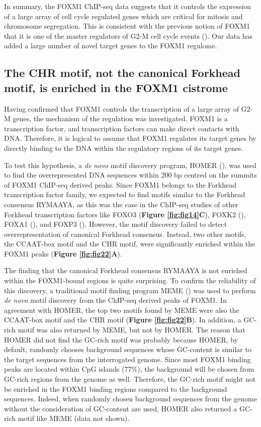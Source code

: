 In summary, the FOXM1 ChIP-seq data suggests that it controls the expression of a large array of cell cycle regulated genes which are critical for mitosis and chromosome segregation. This is consistent with the previous notion of FOXM1 that it is one of the master regulators of G2-M cell cycle events (\cite{laoukili2005foxm1}). Our data has added a large number of novel target genes to the FOXM1 regulome.

\subsection{The CHR motif, not the canonical Forkhead motif, is enriched in the FOXM1 cistrome}

Having confirmed that FOXM1 controls the transcription of a large array of G2-M genes, the mechanism of the regulation was investigated. FOXM1 is a transcription factor, and transcription factors can make direct contacts with DNA. Therefore, it is logical to assume that FOXM1 regulates its target genes by directly binding to the DNA within the regulatory regions of its target genes.

To test this hypothesis, a \textit{de novo} motif discovery program, HOMER (\cite{heinz2010simple}), was used to find the overrepresented DNA sequences within 200 bp centred on the summits of FOXM1 ChIP-seq derived peaks. Since FOXM1 belongs to the Forkhead transcription factor family, we expected to find motifs similar to the Forkhead consensus RYMAAYA, as this was the case in the ChIP-seq studies of other Forkhead transcription factors like FOXO3 (\textbf{Figure \ref{fig:fig14}C}), FOXK2 (\cite{ji2012the}), FOXA1 (\cite{hurtado2011foxa1}), and FOXP3 (\cite{katoh2011foxp3}). However, the motif discovery failed to detect overrepresentation of canonical Forkhead consensus. Instead, two other motifs, the CCAAT-box motif and the CHR motif, were significantly enriched within the FOXM1 peaks (\textbf{Figure \ref{fig:fig22}A}).

The finding that the canonical Forkhead consensus RYMAAYA is not enriched within the FOXM1-bound regions is quite surprising. To confirm the reliability of this discovery, a traditional motif finding program MEME (\cite{bailey1994fitting}) was used to perform \textit{de novo} motif discovery from the ChIP-seq derived peaks of FOXM1. In agreement with HOMER, the top two motifs found by MEME were also the CCAAT-box motif and the CHR motif (\textbf{Figure \ref{fig:fig22}B}). In addition, a GC-rich motif was also returned by MEME, but not by HOMER. The reason that HOMER did not find the GC-rich motif was probably because HOMER, by default, randomly chooses background sequences whose GC-content is similar to the target sequences from the interrogated genome. Since most FOXM1 binding peaks are located within CpG islands (77\%), the background will be chosen from GC-rich regions from the genome as well. Therefore, the GC-rich motif might not be enriched in the FOXM1 binding regions compared to the background sequences. Indeed, when randomly chosen background sequences from the genome without the consideration of GC-content are used, HOMER also returned a GC-rich motif like MEME (data not shown).

